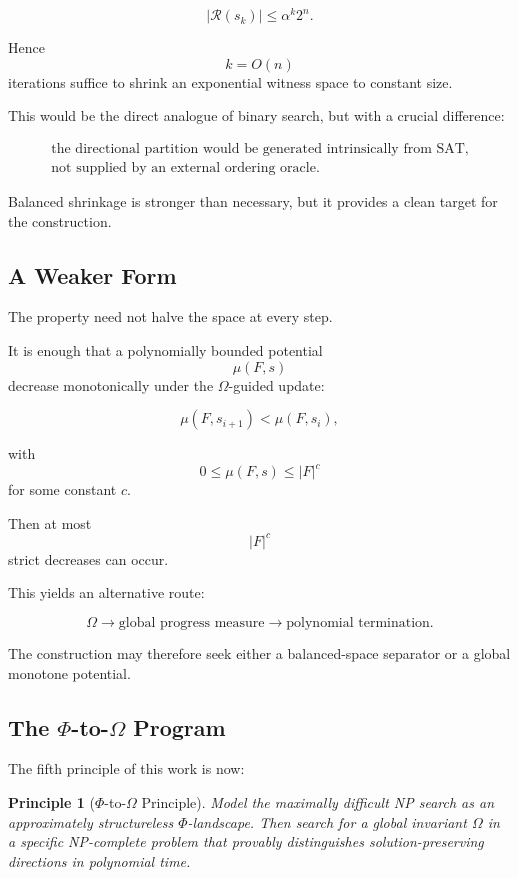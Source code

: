 \documentclass[11pt]{article}
\theoremstyle{plain}
\newtheorem{principle}[theorem]{Principle}
\theoremstyle{definition}
\begin{document}
\[
    |\mathcal{R}(s_k)|
    \leq
    \alpha^k 2^n.
\]

Hence
\[
    k=O(n)
\]
iterations suffice to shrink an exponential witness space to constant size.

This would be the direct analogue of binary search, but with a crucial
difference:

\[
\boxed{\begin{gathered}
\text{the directional partition would be generated intrinsically from SAT,}\\
\text{not supplied by an external ordering oracle.}
\end{gathered}}
\]

Balanced shrinkage is stronger than necessary, but it provides a clean target
for the construction.

\subsection{A Weaker Form}

The property need not halve the space at every step.

It is enough that a polynomially bounded potential
\[
    \mu(F,s)
\]
decrease monotonically under the \(\Omega\)-guided update:

\[
    \mu(F,s_{i+1})
    <
    \mu(F,s_i),
\]

with
\[
    0\leq \mu(F,s)\leq |F|^{c}
\]
for some constant \(c\).

Then at most
\[
    |F|^c
\]
strict decreases can occur.

This yields an alternative route:

\[
\boxed{
\Omega
\rightarrow
\text{global progress measure}
\rightarrow
\text{polynomial termination}.
}
\]

The construction may therefore seek either a balanced-space separator or a
global monotone potential.

\subsection{The \(\Phi\)-to-\(\Omega\) Program}

The fifth principle of this work is now:

\begin{principle}[\(\Phi\)-to-\(\Omega\) Principle]
\label{principle:phi-to-omega}
Model the maximally difficult NP search as an approximately structureless
\(\Phi\)-landscape.  Then search for a global invariant \(\Omega\) in a
specific NP-complete problem that provably distinguishes solution-preserving
directions in polynomial time.
\end{principle}
\end{document}
